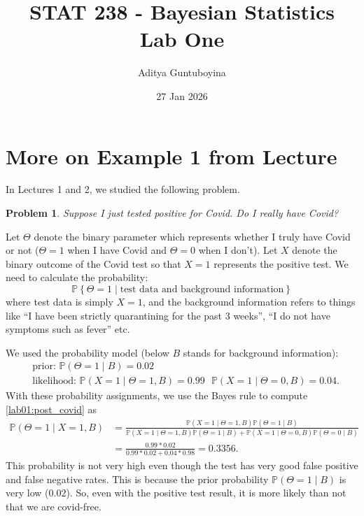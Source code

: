 \documentclass{scrartcl}
\newtheorem{problem}[theorem]{Problem}
\renewcommand{\P}{{\mathbb P}}
\begin{document}
\title{STAT 238 - Bayesian Statistics  \\
Lab One} 

\author{Aditya Guntuboyina}


\date{27 Jan 2026}

\maketitle

\section{More on Example 1 from Lecture}

In Lectures 1 and 2, we studied the following problem. 
\begin{problem}
Suppose I just tested positive for Covid. Do I really have Covid?
\end{problem}

Let $\Theta$ denote the binary parameter which represents whether I
truly have Covid or not ($\Theta = 1$ when I have Covid and $\Theta =
0$ when I don't). Let $X$ denote the binary outcome of the Covid test
so that $X = 1$ represents the positive test. We need to calculate the
probability:
\begin{equation}\label{lab01:post_covid}
\P \left\{\Theta = 1 \mid \text{test data} \text{ and } \text{background
information} \right\} 
\end{equation}
where test data is simply $X = 1$, and the background information
refers to things like ``I have been strictly
quarantining for the past 3 weeks'', ``I do not have symptoms such as
fever'' etc.

We used the probability model (below $B$ stands for background
information): 
\begin{equation*}
\begin{split}
&  \text{prior: }  \P(\Theta = 1 \mid B) = 0.02  \\
& \text{likelihood: } \P(X = 1\mid \Theta = 1, B) = 0.99 ~~~
\P(X = 1 \mid \Theta = 0, B) = 0.04.
\end{split}  
\end{equation*}
With these probability assignments, we use the Bayes rule to compute 
\eqref{lab01:post_covid} as
\begin{align*}
    \P(\Theta = 1 \mid X = 1, B) &= \frac{\P(X  = 1 
    \mid \Theta = 1, B) \P(\Theta = 1 \mid B)}{\P(X = 1
    \mid \Theta = 1, B) \P(\Theta = 1 \mid B) + \P(X = 1
    \mid \Theta = 0, B) \P(\Theta = 0 \mid B)} \\
    &= \frac{0.99 *
    0.02}{0.99 * 0.02 + 0.04*0.98} = 0.3356. 
\end{align*}
This probability is not very high even though the test has very good
false positive and false negative 
rates. This is because the prior probability $\P(\Theta = 1 \mid B)$
is very low   ($0.02$). So, even with the positive test result, it
is more likely than not that we are covid-free.
\end{document}
